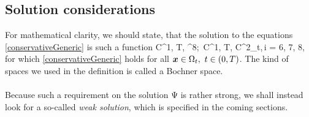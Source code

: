 \subsection{Solution considerations}
For mathematical clarity, we should state, that the solution to the equations \ref{conservativeGeneric} is such a function
\be
\label{HardSln} \mathrm{\Psi}\in C^1\lo{}, T\ro, ^8\ro;\ \in C^1\lo{}, T\ro, C^2\lo\Omega_{t}\ro\ro,\,i = 6, 7, 8,
\ee
for which \ref{conservativeGeneric} holds for all $\mbox{\boldmath $x$}\in\Omega_t,\ t\in\left( 0, T\right)$. The kind of spaces we used in the definition is called a Bochner space.
\paragraph{}
Because such a requirement on the solution $\mathrm{\Psi}$ is rather strong, we shall instead look for a so-called \textit{weak solution}, which is specified in the coming sections.